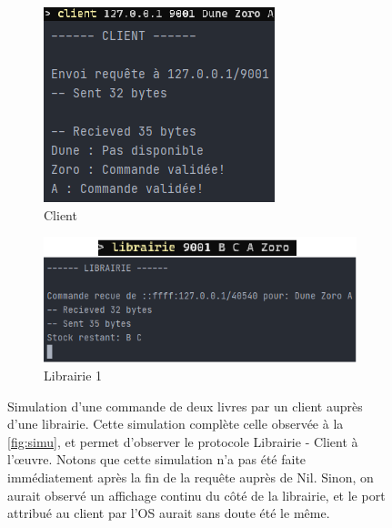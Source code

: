 \documentclass[
  french,
  twocolumn,
	9pt, %
]{fphw}
\begin{document}
\begin{figure}[h!]
  \centering
  \begin{subfigure}{0.35\textwidth}
    \centering
    \includegraphics[width=\textwidth]{commandA.png}
    \caption{Client}
    \label{fig:com1}
  \end{subfigure}
  \begin{subfigure}{.45\textwidth}
    \centering
    \includegraphics[width=\textwidth]{commandB.png}
    \caption{Librairie 1}
    \label{fig:com2}
  \end{subfigure}
  \caption{Simulation d'une commande de deux livres par un client auprès d'une librairie. Cette simulation complète celle observée à la \cref{fig:simu}, et permet d'observer le protocole Librairie - Client à l'\oe{}uvre. Notons que cette simulation n'a pas été faite immédiatement après la fin de la requête auprès de Nil. Sinon, on aurait observé un affichage continu du côté de la librairie, et le port attribué au client par l'OS aurait sans doute été le même.}
  \label{fig:simu2}
\end{figure}
\end{document}
